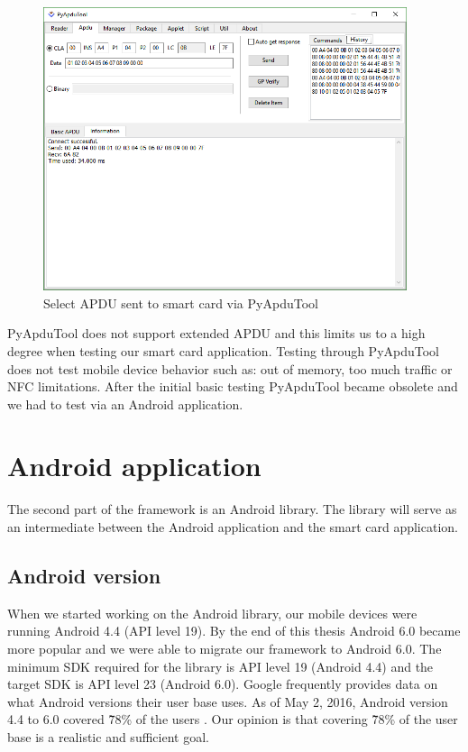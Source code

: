 \begin{figure}[h!]
  \caption{Select APDU sent to smart card via PyApduTool}
  \label{fig:pyapdutool}
  \centering
    \includegraphics[width=0.95\textwidth]{images/pyapdutool.png}
\end{figure}

PyApduTool does not support extended APDU and this limits us to a high degree when testing our smart card application. Testing through PyApduTool does not test mobile device behavior such as: out of memory, too much traffic or NFC limitations. After the initial basic testing PyApduTool became obsolete and we had to test via an Android application.


\section{Android application}
The second part of the framework is an Android library. The library will serve as an intermediate between the Android application and the smart card application.

\subsection{Android version}
When we started working on the Android library, our mobile devices were running Android 4.4 (API level 19). By the end of this thesis Android 6.0 became more popular and we were able to migrate our framework to Android 6.0. The minimum SDK required for the library is API level 19 (Android 4.4) and the target SDK is API level 23 (Android 6.0). Google frequently provides data on what Android versions their user base uses. As of May 2, 2016, Android version 4.4 to 6.0 covered \~78\% of the users \cite{AndroidAPIDistributions}. Our opinion is that covering \~78\% of the user base is a realistic and sufficient goal.


